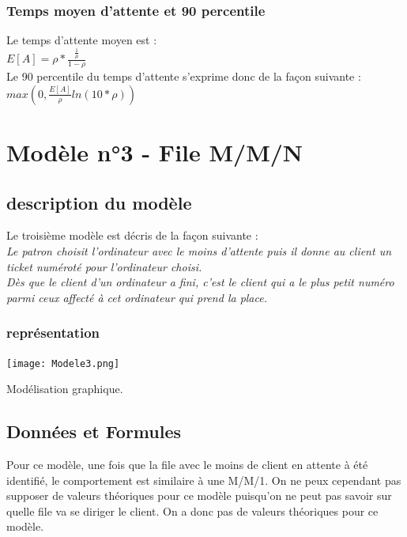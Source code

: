 \documentclass[a4paper,11pt]{article}
\begin{document}
		\subsubsection{Temps moyen d'attente et 90 percentile}
		Le temps d'attente moyen est :\\
		$E[A] = \rho * \frac{\frac{1}{\mu}}{1-\rho}$
		\\
		Le 90 percentile du temps d'attente s'exprime donc de la façon suivante :\\
		$max(0,\frac{E[A]}{\rho}ln(10*\rho))$
		

\section{Modèle n°3 - File M/M/N}
	\subsection{description du modèle}
	Le troisième modèle est décris de la façon suivante :\\
	\textit{Le patron choisit l'ordinateur avec le moins d'attente puis il donne au client un ticket numéroté pour l'ordinateur choisi.\\
			Dès que le client d'un ordinateur a fini, c'est le client qui a le plus petit numéro parmi ceux affecté à cet ordinateur qui prend la place.}
	\subsubsection{représentation}
	\centerline{\texttt{[image: Modele3.png]}}
	Modélisation graphique.\\
	
	\subsection{Données et Formules}
	Pour ce modèle, une fois que la file avec le moins de client en attente à été identifié, le comportement est similaire à une M/M/1. On ne peux cependant pas supposer de valeurs théoriques pour ce modèle puisqu'on ne peut pas savoir sur quelle file va se diriger le client. On a donc pas de valeurs théoriques pour ce modèle.
	
\end{document}
